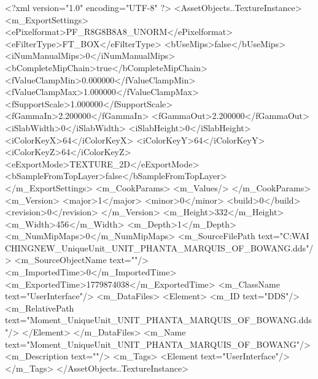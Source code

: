 <?xml version="1.0" encoding="UTF-8" ?>
<AssetObjects..TextureInstance>
	<m_ExportSettings>
		<ePixelformat>PF_R8G8B8A8_UNORM</ePixelformat>
		<eFilterType>FT_BOX</eFilterType>
		<bUseMips>false</bUseMips>
		<iNumManualMips>0</iNumManualMips>
		<bCompleteMipChain>true</bCompleteMipChain>
		<fValueClampMin>0.000000</fValueClampMin>
		<fValueClampMax>1.000000</fValueClampMax>
		<fSupportScale>1.000000</fSupportScale>
		<fGammaIn>2.200000</fGammaIn>
		<fGammaOut>2.200000</fGammaOut>
		<iSlabWidth>0</iSlabWidth>
		<iSlabHeight>0</iSlabHeight>
		<iColorKeyX>64</iColorKeyX>
		<iColorKeyY>64</iColorKeyY>
		<iColorKeyZ>64</iColorKeyZ>
		<eExportMode>TEXTURE_2D</eExportMode>
		<bSampleFromTopLayer>false</bSampleFromTopLayer>
	</m_ExportSettings>
	<m_CookParams>
		<m_Values/>
	</m_CookParams>
	<m_Version>
		<major>1</major>
		<minor>0</minor>
		<build>0</build>
		<revision>0</revision>
	</m_Version>
	<m_Height>332</m_Height>
	<m_Width>456</m_Width>
	<m_Depth>1</m_Depth>
	<m_NumMipMaps>0</m_NumMipMaps>
	<m_SourceFilePath text="C:\Users\YANG WAI CHING\Downloads\CIV\DDS NEW\Moment_UniqueUnit_UNIT_PHANTA_MARQUIS_OF_BOWANG.dds"/>
	<m_SourceObjectName text=""/>
	<m_ImportedTime>0</m_ImportedTime>
	<m_ExportedTime>1779874038</m_ExportedTime>
	<m_ClassName text="UserInterface"/>
	<m_DataFiles>
		<Element>
			<m_ID text="DDS"/>
			<m_RelativePath text="Moment_UniqueUnit_UNIT_PHANTA_MARQUIS_OF_BOWANG.dds"/>
		</Element>
	</m_DataFiles>
	<m_Name text="Moment_UniqueUnit_UNIT_PHANTA_MARQUIS_OF_BOWANG"/>
	<m_Description text=""/>
	<m_Tags>
		<Element text="UserInterface"/>
	</m_Tags>
</AssetObjects..TextureInstance>

